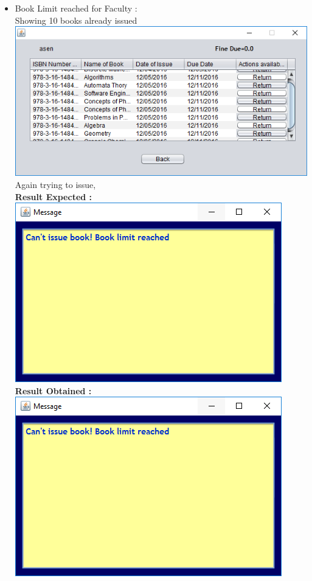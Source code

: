 \documentclass{article}
\begin{document}
\begin{enumerate}
\begin{itemize}
\item Book Limit reached for Faculty :\\
Showing 10 books already issued\\
\includegraphics[scale=0.8]{images/BookLimitFaculty.PNG}\\
Again trying to issue,\\
\textbf{Result Expected :}\\
\includegraphics[scale=0.8]{images/BookLimitError.PNG}\\
\textbf{Result Obtained :}\\
\includegraphics[scale=0.8]{images/BookLimitError.PNG}\\
\end{itemize}



\end{enumerate}
\end{document}
